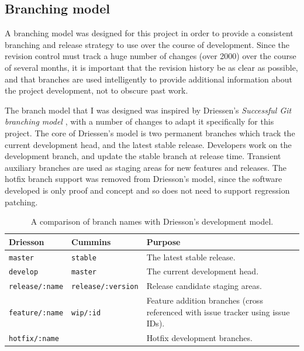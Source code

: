\subsection{Branching model}

A branching model was designed for this project in order to provide a
consistent branching and release strategy to use over the course of
development. Since the revision control must track a huge number of
changes (over 2000) over the course of several months, it is important
that the revision history be as clear as possible, and that branches
are used intelligently to provide additional information about the
project development, not to obscure past work.

The branch model that I was designed was inspired by Driessen's
\textit{Successful Git branching model} \cite{driessen2012successful},
with a number of changes to adapt it specifically for this
project. The core of Driessen's model is two permanent branches which
track the current development head, and the latest stable
release. Developers work on the development branch, and update the
stable branch at release time. Transient auxiliary branches are used
as staging areas for new features and releases. The hotfix branch
support was removed from Driesson's model, since the software
developed is only proof and concept and so does not need to support
regression patching.


\begin{table}[H]
\centering
\begin{tabular}{l l L{8cm}}
\textbf{Driesson} & \textbf{Cummins} & \textbf{Purpose}\\
\hline
\texttt{master} & \texttt{stable} & The latest stable release.\\
\texttt{develop} & \texttt{master} & The current development head.\\
\texttt{release/:name} & \texttt{release/:version} & Release candidate staging areas.\\
\texttt{feature/:name} & \texttt{wip/:id} & Feature addition branches (cross referenced with issue tracker using issue IDs).\\
\texttt{hotfix/:name} & & Hotfix development branches.\\
\end{tabular}
\caption[Development model branch names]
        {A comparison of branch names with Driesson's development model.}
\label{tab:branch-names}
\end{table}


